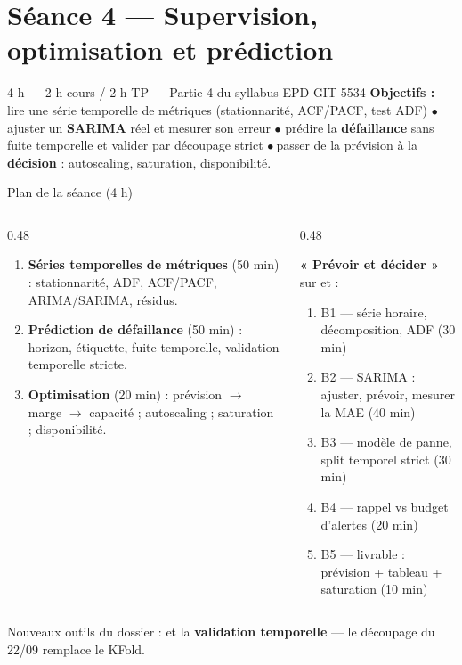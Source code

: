 \section{Séance 4 --- Supervision, optimisation et prédiction}
{4 h --- 2 h cours / 2 h TP --- Partie 4 du syllabus EPD-GIT-5534}
{\textbf{Objectifs :} lire une série temporelle de métriques (stationnarité,
ACF/PACF, test ADF) $ \bullet $ ajuster un \textbf{SARIMA} réel et mesurer
son erreur $ \bullet $ prédire la \textbf{défaillance} sans fuite temporelle
et valider par découpage strict $ \bullet \ $passer de la prévision à la
\textbf{décision} : autoscaling, saturation, disponibilité.}

\begin{frame}{Plan de la séance (4 h)}
\begin{columns}[t]
\begin{column}{0.48\textwidth}
\begin{kbox}
\begin{enumerate}
\item \textbf{Séries temporelles de métriques} (50 min) : stationnarité,
ADF, ACF/PACF, ARIMA/SARIMA, résidus.
\item \textbf{Prédiction de défaillance} (50 min) : horizon, étiquette,
fuite temporelle, validation temporelle stricte.
\item \textbf{Optimisation} (20 min) : prévision $\to$ marge $\to$
capacité ; autoscaling ; saturation ; disponibilité.
\end{enumerate}
\end{kbox}
\end{column}
\begin{column}{0.48\textwidth}
\begin{ebox}
\textbf{« Prévoir et décider »} sur  et
 :
\begin{enumerate}
\item B1 --- série horaire, décomposition, ADF (30 min)
\item B2 --- SARIMA : ajuster, prévoir, mesurer la MAE (40 min)
\item B3 --- modèle de panne, split temporel strict (30 min)
\item B4 --- rappel vs budget d'alertes (20 min)
\item B5 --- livrable : prévision + tableau + saturation (10 min)
\end{enumerate}
\end{ebox}
\end{column}
\end{columns}
\vspace{1mm}
\begin{center}\small
Nouveaux outils du dossier :  et la
\textbf{validation temporelle} --- le découpage du 22/09
remplace le KFold.
\end{center}
\end{frame}

